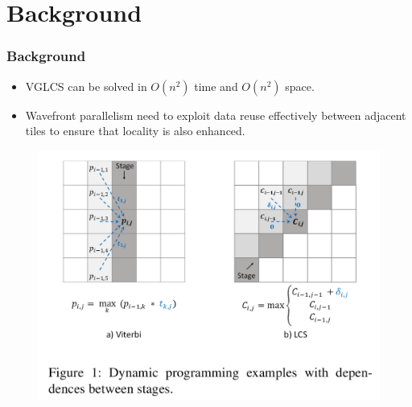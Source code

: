 \section{Background}

\begin{frame}
    \frametitle{Background}
    \begin{itemize}
    	\setlength\itemsep{1em}
    	\item VGLCS can be solved in $O(n^2)$ time and $O(n^2)$ space.
    	\item Wavefront parallelism need to exploit data reuse effectively between adjacent tiles to ensure that locality is also enhanced.
    \end{itemize}
    \begin{figure}
		\includegraphics[scale=0.20]{figure/fig-wavefront-dp.png}
	\end{figure}
\end{frame}